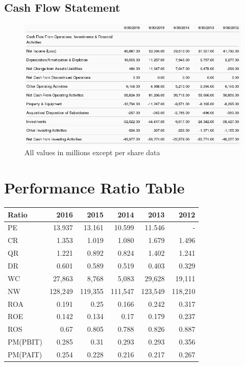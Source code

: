 \documentclass[12pt,a4paper,titlepage]{article}
\begin{document}
\subsection{Cash Flow Statement}
\begin{figure}[!htb]
  \centering
  \includegraphics[width=1\textwidth]{cash-flow}
    \caption{All values in millions except per share data~\cite{zacks-cash}}
\end{figure}

\newpage

\appendix

\section{Performance Ratio Table}
  \begin{center}
    \begin{tabular}{lrrrrr}
      Ratio & 2016 & 2015 & 2014 & 2013 & 2012\\
      \hline
      PE & 13.937 & 13.161 & 10.599 & 11.546 & -\\
      CR & 1.353 & 1.019 & 1.080 & 1.679 & 1.496\\
      QR & 1.221 & 0.892 & 0.824 & 1.402 & 1.241\\
      DR & 0.601 & 0.589 & 0.519 & 0.403 & 0.329\\
      WC & 27,863 & 8,768 & 5,083 & 29,628 & 19,111\\
      NW & 128,249 & 119,355 & 111,547 & 123,549 & 118,210\\
      ROA & 0.191 & 0.25 & 0.166 & 0.242 & 0.317\\
      ROE & 0.142 & 0.134 & 0.17 & 0.179 & 0.237\\
      ROS & 0.67 & 0.805 & 0.788 & 0.826 & 0.887\\
      PM(PBIT) & 0.285 & 0.31 & 0.293 & 0.293 & 0.356\\
      PM(PAIT) & 0.254 & 0.228 & 0.216 & 0.217 & 0.267\\
    \end{tabular}
  \end{center}

\newpage

\printbibliography[
heading=bibintoc,
title={Resources}
]
\end{document}
